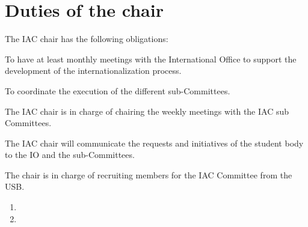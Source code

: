 {\protect\section{Duties of the chair}
The IAC chair has the following obligations:
\protect\begin{parenum}
	\item To have at least monthly meetings with the International Office to support the
	development of the internationalization process.
	\item To coordinate the execution of the different sub-Committees.
	\item The IAC chair is in charge of chairing the weekly meetings with the IAC sub
	Committees.
	\item The IAC chair will communicate the requests and initiatives of the student body to the
	IO and the sub-Committees.
	\item The chair is in charge of recruiting members for the IAC Committee from the USB.	
\end{parenum}
}


\begin{enumerate}
    \item {}
    \item {}
\end{enumerate}
